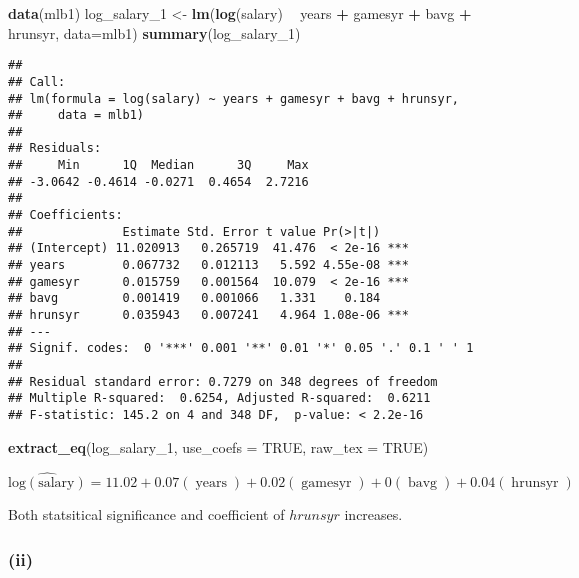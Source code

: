 \documentclass[
]{article}
\newenvironment{Shaded}{\begin{snugshade}}{\end{snugshade}}
\newcommand{\DataTypeTok}[1]{\textcolor[rgb]{0.13,0.29,0.53}{#1}}
\newcommand{\DecValTok}[1]{\textcolor[rgb]{0.00,0.00,0.81}{#1}}
\newcommand{\KeywordTok}[1]{\textcolor[rgb]{0.13,0.29,0.53}{\textbf{#1}}}
\newcommand{\NormalTok}[1]{#1}
\newcommand{\OperatorTok}[1]{\textcolor[rgb]{0.81,0.36,0.00}{\textbf{#1}}}
\newcommand{\OtherTok}[1]{\textcolor[rgb]{0.56,0.35,0.01}{#1}}
\newcommand{\StringTok}[1]{\textcolor[rgb]{0.31,0.60,0.02}{#1}}
\begin{document}
\begin{Shaded}
\begin{Highlighting}[]
\KeywordTok{data}\NormalTok{(mlb1)}
\NormalTok{log_salary_}\DecValTok{1}\NormalTok{ <-}\StringTok{ }\KeywordTok{lm}\NormalTok{(}\KeywordTok{log}\NormalTok{(salary) }\OperatorTok{~}\StringTok{ }\NormalTok{years }\OperatorTok{+}\StringTok{ }\NormalTok{gamesyr }\OperatorTok{+}\StringTok{ }\NormalTok{bavg }\OperatorTok{+}\StringTok{ }\NormalTok{hrunsyr, }\DataTypeTok{data=}\NormalTok{mlb1)}
\KeywordTok{summary}\NormalTok{(log_salary_}\DecValTok{1}\NormalTok{)}
\end{Highlighting}
\end{Shaded}

\begin{verbatim}
## 
## Call:
## lm(formula = log(salary) ~ years + gamesyr + bavg + hrunsyr, 
##     data = mlb1)
## 
## Residuals:
##     Min      1Q  Median      3Q     Max 
## -3.0642 -0.4614 -0.0271  0.4654  2.7216 
## 
## Coefficients:
##              Estimate Std. Error t value Pr(>|t|)    
## (Intercept) 11.020913   0.265719  41.476  < 2e-16 ***
## years        0.067732   0.012113   5.592 4.55e-08 ***
## gamesyr      0.015759   0.001564  10.079  < 2e-16 ***
## bavg         0.001419   0.001066   1.331    0.184    
## hrunsyr      0.035943   0.007241   4.964 1.08e-06 ***
## ---
## Signif. codes:  0 '***' 0.001 '**' 0.01 '*' 0.05 '.' 0.1 ' ' 1
## 
## Residual standard error: 0.7279 on 348 degrees of freedom
## Multiple R-squared:  0.6254, Adjusted R-squared:  0.6211 
## F-statistic: 145.2 on 4 and 348 DF,  p-value: < 2.2e-16
\end{verbatim}

\begin{Shaded}
\begin{Highlighting}[]
\KeywordTok{extract_eq}\NormalTok{(log_salary_}\DecValTok{1}\NormalTok{, }\DataTypeTok{use_coefs =} \OtherTok{TRUE}\NormalTok{, }\DataTypeTok{raw_tex =} \OtherTok{TRUE}\NormalTok{)}
\end{Highlighting}
\end{Shaded}

\[
\operatorname{\widehat{log(salary)}} = 11.02 + 0.07(\operatorname{years}) + 0.02(\operatorname{gamesyr}) + 0(\operatorname{bavg}) + 0.04(\operatorname{hrunsyr})
\]

Both statsitical significance and coefficient of \(hrunsyr\) increases.

\hypertarget{ii-3}{%
\subsubsection{(ii)}\label{ii-3}}
\end{document}
